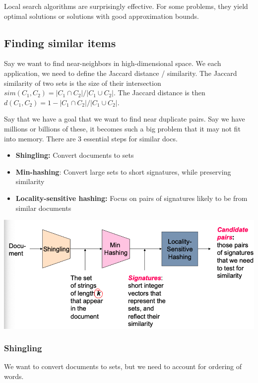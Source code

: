     Local search algorithms are surprisingly effective. For some problems, they yield optimal solutions or solutions with good approximation bounds.
    
    
    
\subsection{Finding similar items}
    Say we want to find near-neighbors in high-dimensional space. We each application, we need to define the Jaccard distance / similarity. The Jaccard similarity of two sets is the size of their intersection $sim(C_1, C_2) = |C_1 \cap C_2|/|C_1 \cup C_2|$. The Jaccard distance is then $d(C_1, C_2) = 1 - |C_1 \cap C_2|/|C_1 \cup C_2|$. 
    
    Say that we have a goal that we want to find near duplicate pairs. Say we have millions or billions of these, it becomes such a big problem that it may not fit into memory. There are $3$ essential steps for similar docs. 
    \begin{itemize}
        \item \textbf{Shingling:} Convert documents to sets
        \item \textbf{Min-hashing}: Convert large sets to short signatures, while preserving similarity
        \item \textbf{Locality-sensitive hashing:} Focus on pairs of signatures likely to be from similar documents
    \end{itemize}
    
    \begin{center}
        \includegraphics[width=1\textwidth]{images/documents.png}
    \end{center}
    
    \subsubsection{Shingling}
        We want to convert documents to sets, but we need to account for ordering of words. 
        
